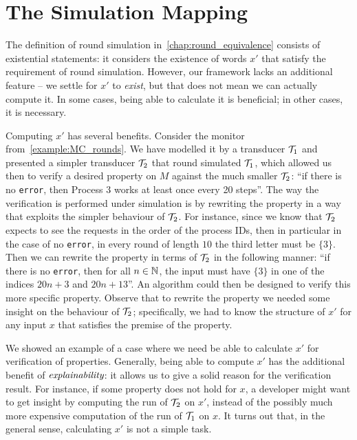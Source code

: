 \chapter{The Simulation Mapping}
\label{chap:equiv_mapping}

The definition of round simulation in~\cref{chap:round_equivalence} consists of existential statements: it considers the existence of words $x'$ that satisfy the requirement of round simulation.
However, our framework lacks an additional feature -- we settle for $x'$ to \emph{exist}, but that does not mean we can actually compute it. In some cases, being able to calculate it is beneficial; in other cases, it is necessary.

Computing $x'$ has several benefits. Consider the monitor from~\cref{example:MC_rounds}. We have modelled it by a transducer $\mathcal{T}_1$ and presented a simpler transducer $\mathcal{T}_2$ that round simulated $\mathcal{T}_1$, which allowed us then to verify a desired property on $M$ against the much smaller $\mathcal{T}_2$: ``if there is no \texttt{error}, then Process $3$ works at least once every 20 steps''.
The way the verification is performed under simulation is by rewriting the property in a way that exploits the simpler behaviour of $\mathcal{T}_2$. For instance, since we know that $\mathcal{T}_2$ expects to see the requests in the order of the process IDs, then in particular in the case of no \texttt{error}, in every round of length $10$ the third letter must be $\{3\}$. Then we can rewrite the property in terms of $\mathcal{T}_2$ in the following manner:
``if there is no \texttt{error}, then for all $n\in\mathbb{N}$, the input must have $\{3\}$ in one of the indices $20n+3$ and $20n+13$''.
An algorithm could then be designed to verify this more specific property.
Observe that to rewrite the property we needed some insight on the behaviour of $\mathcal{T}_2$; specifically, we had to know the structure of $x'$ for any input $x$ that satisfies the premise of the property.

We showed an example of a case where we need be able to calculate $x'$ for verification of properties. Generally, being able to compute $x'$ has the additional benefit of $\emph{explainability}$: it allows us to give a solid reason for the verification result. For instance, if some property does not hold for $x$, a developer might want to get insight
by computing the run of $\mathcal{T}_2$ on $x'$, instead of the possibly much more expensive computation of the run of $\mathcal{T}_1$ on $x$.
It turns out that, in the general sense, calculating $x'$ is not a simple task.

